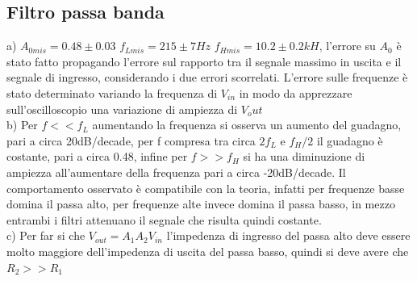 \documentclass[10pt,a4paper]{article}
\begin{document}
\subsection{Filtro passa banda}
a) $A_{0mis}=0.48\pm0.03$ $f_{Lmis}=215\pm7 Hz$ $f_{Hmis}=10.2\pm0.2 kH$, l'errore su $A_0$ è stato fatto propagando l'errore sul rapporto tra il segnale massimo in uscita e il segnale di ingresso, considerando i due errori scorrelati. L'errore sulle frequenze è stato determinato variando la frequenza di $V_{in}$ in modo da apprezzare sull’oscilloscopio una variazione di ampiezza di $V_out$\\
b) Per $f<<f_L$ aumentando la frequenza si osserva un aumento del guadagno, pari a circa 20dB/decade, per f compresa tra circa $2f_L$ e $f_H/2$ il guadagno è costante, pari a circa 0.48, infine per $f>>f_H$ si ha una diminuzione di ampiezza all'aumentare della frequenza pari a circa -20dB/decade. Il comportamento osservato è compatibile con la teoria, infatti per frequenze basse domina il passa alto, per frequenze alte invece domina il passa basso, in mezzo entrambi i filtri attenuano il segnale che risulta quindi costante.\\
c) Per far si che $V_{out}=A_1 A_2 V_{in}$ l'impedenza di ingresso del passa alto deve essere molto maggiore dell'impedenza di uscita del passa basso, quindi si deve avere che $R_2>>R_1$
\end{document}
